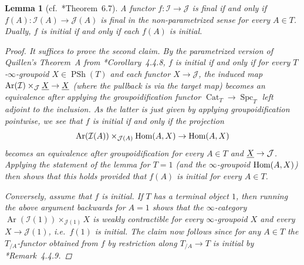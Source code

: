 \documentclass[reqno]{memo-l}
\theoremstyle{mythm}
\newtheorem{lemma}[thm]{Lemma}
\theoremstyle{definition}
\numberwithin{equation}{section}
\newcommand{\Ii}{{\mathcal{I}}}
\newcommand{\Jj}{{\mathcal J}}
\DeclareMathOperator{\Spc}{Spc}
\DeclareMathOperator{\Cat}{Cat}
\renewcommand{\hom}{\textup{hom}}
\DeclareMathOperator{\PSh}{PSh}
\DeclareMathOperator{\Ar}{Ar}
\renewcommand{\hom}{{\textup{Hom}}}
\newcommand{\ulhelper}[2]{\underline{\setbox0=\hbox{$#1#2$}\dp0=0.4pt \box0\relax}}
\newcommand{\ul}[1]{{\mathpalette\ulhelper{#1}}\hbox{\rule[-2pt]{0pt}{0pt}}}
\begin{document}
\begin{lemma}[cf.~\cite{shah2021parametrized}*{Theorem~6.7}]
    A functor $f\colon\Ii\to\Jj$ is final if and only if $f(A)\colon\Ii(A)\to\Jj(A)$ is final in the non-parametrized sense for every $A\in T$. Dually, $f$ is initial if and only if each $f(A)$ is initial.
    \begin{proof}
        It suffices to prove the second claim. By the parametrized version of Quillen's Theorem~A from \cite{martini2021yoneda}*{Corollary~4.4.8}, $f$ is initial if and only if for every $T$-$\infty$-groupoid $X\in\PSh(T)$ and each functor $X\to\Jj$, the induced map
        $\Ar(\Ii)\times_{\Jj}\ul X\to\ul X$ (where the pullback is via the target map) becomes an equivalence after applying the groupoidification functor $\Cat_T\to\Spc_T$ left adjoint to the inclusion. As the latter is just given by applying groupoidification pointwise, we see that $f$ is initial if and only if the projection \[\Ar(\Ii(A))\times_{\Jj(A)}\hom(A,X)\to\hom(A,X)\] becomes an equivalence after groupoidification for every $A\in T$ and $\ul X\to\Jj$. Applying the statement of the lemma for $T=1$ (and the $\infty$-groupoid $\hom(A,X)$) then shows that this holds provided that $f(A)$ is initial for every $A\in T$.

        Conversely, assume that $f$ is initial. If $T$ has a terminal object $1$, then running the above argument backwards for $A=1$ shows that the $\infty$-category $\Ar(\Ii(1))\times_{\Jj(1)} X$ is weakly contractible for every $\infty$-groupoid $X$ and every $X\to\Jj(1)$, i.e.\ $f(1)$ is initial. The claim now follows since for any $A\in T$ the $T_{/A}$-functor obtained from $f$ by restriction along $T_{/A}\to T$ is initial by \cite{martini2021yoneda}*{Remark~4.4.9}.
    \end{proof}
\end{lemma}
\end{document}
